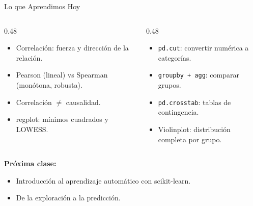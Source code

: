 \documentclass[aspectratio=169, 11pt]{beamer}
\begin{document}
\begin{frame}{Lo que Aprendimos Hoy}
  \vspace{-4pt}
  \begin{columns}[T]
    \begin{column}{0.48\textwidth}
      {\footnotesize
      \begin{itemize}\setlength{\itemsep}{4pt}
        \item[{\color{codeGreen}\faCheckCircle}]
          Correlación: fuerza y dirección de la relación.
        \item[{\color{codeGreen}\faCheckCircle}]
          Pearson (lineal) vs Spearman (monótona, robusta).
        \item[{\color{codeGreen}\faCheckCircle}]
          Correlación $\neq$ causalidad.
        \item[{\color{codeGreen}\faCheckCircle}]
          regplot: mínimos cuadrados y LOWESS.
      \end{itemize}
      }
    \end{column}

    \begin{column}{0.48\textwidth}
      {\footnotesize
      \begin{itemize}\setlength{\itemsep}{4pt}
        \item[{\color{codeGreen}\faCheckCircle}]
          \texttt{pd.cut}: convertir numérica a categorías.
        \item[{\color{codeGreen}\faCheckCircle}]
          \texttt{groupby + agg}: comparar grupos.
        \item[{\color{codeGreen}\faCheckCircle}]
          \texttt{pd.crosstab}: tablas de contingencia.
        \item[{\color{codeGreen}\faCheckCircle}]
          Violinplot: distribución completa por grupo.
      \end{itemize}
      }
    \end{column}
  \end{columns}

  \vspace{6pt}
  {\small\color{arcaDark}\bfseries Próxima clase:}
  \vspace{2pt}
  {\footnotesize
  \begin{itemize}\setlength{\itemsep}{2pt}
    \item[{\color{arcaRed}\faArrowRight}]
      Introducción al aprendizaje automático con scikit-learn.
    \item[{\color{arcaRed}\faArrowRight}]
      De la exploración a la predicción.
  \end{itemize}
  }
\end{frame}
\end{document}
